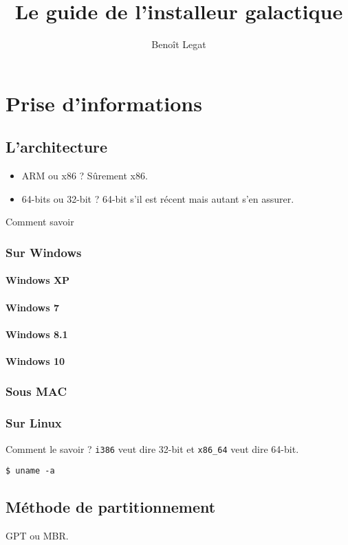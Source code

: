 \documentclass{../guide}
\title{Le guide de l'installeur galactique}
\author{Benoît Legat}
\begin{document}
\maketitle

\section{Prise d'informations}
\subsection{L'architecture}
\begin{itemize}
  \item ARM ou x86 ? Sûrement x86.
  \item 64-bits ou 32-bit ? 64-bit s'il est récent mais autant s'en assurer.
\end{itemize}

Comment savoir
\subsubsection{Sur Windows}
\paragraph{Windows XP}
\paragraph{Windows 7}
\paragraph{Windows 8.1}
\paragraph{Windows 10}
\subsubsection{Sous MAC}
\subsubsection{Sur Linux}
Comment le savoir ? \verb|i386| veut dire 32-bit et \verb|x86_64| veut dire 64-bit.
\begin{verbatim}
$ uname -a
\end{verbatim}

\subsection{Méthode de partitionnement}
GPT ou MBR.
\end{document}
